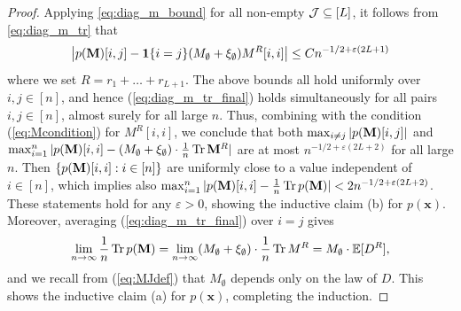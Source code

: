 \documentclass[10pt,reqno]{amsart}
\def\1{\mathbf{1}}
\def\bx{\mathbf{x}}
\def\eps{\varepsilon}
\def\Tr{\operatorname{Tr}}
\begin{document}
\begin{proof}
Applying \eqref{eq:diag_m_bound} for all non-empty 
$\mathcal{J}\subseteq [L]$, it follows from \eqref{eq:diag_m_tr} that
\begin{equation}\label{eq:diag_m_tr_final}
\big|p(\bM)[i,j] - \1\{i=j\}(M_\emptyset+\xi_\emptyset)
M^{R}[i,i]\big| \leq Cn^{-1/2+\eps(2L+1)}
\end{equation}
where we set $R=r_1+\ldots+r_{L+1}$. The above bounds all hold uniformly
over $i,j \in [n]$, and hence (\ref{eq:diag_m_tr_final})
holds simultaneously for all
pairs $i,j \in [n]$, almost surely for all large $n$. Thus, combining with the
condition (\ref{eq:Mcondition}) for $M^R[i,i]$, we conclude that both
$\max_{i\neq j} |p(\mathbf{M})[i,j]|$ and
$\max_{i=1}^n |p(\bM)[i,i]-(M_\emptyset+\xi_\emptyset) \cdot \frac{1}{n}\Tr
\bM^R|$ are at most $n^{-1/2+\eps(2L+2)}$ for all large $n$.
Then $\{p(\mathbf{M})[i,i]:i \in [n]\}$
are uniformly close to a value independent of $i \in [n]$, which implies also
$\max_{i=1}^n |p(\bM)[i,i]-\frac{1}{n}\Tr p(\bM)|<2n^{-1/2+\eps(2L+2)}$.
These statements hold for any $\eps>0$, showing the inductive claim (b) for
$p(\bx)$. Moreover, averaging (\ref{eq:diag_m_tr_final}) over $i=j$ gives
\begin{align*}
	\lim_{n\to\infty}\frac{1}{n}\Tr p(\bM)=\lim_{n\to\infty} 
	(M_\emptyset+\xi_\emptyset) \cdot \frac{1}{n} \Tr M^R = M_\emptyset \cdot \EE[D^R],
\end{align*}
and we recall from (\ref{eq:MJdef}) that $M_\emptyset$ depends only on the law
of $D$. This shows the inductive claim (a) for $p(\bx)$, completing the
induction.
\end{proof}
\end{document}
